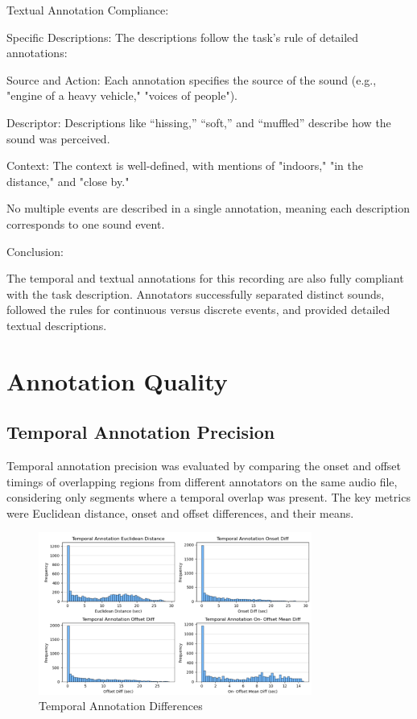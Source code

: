 \documentclass{article}
\begin{document}
Textual Annotation Compliance:

Specific Descriptions: The descriptions follow the task’s rule of detailed annotations:

Source and Action: Each annotation specifies the source of the sound (e.g., "engine of a heavy vehicle," "voices of people").

Descriptor: Descriptions like “hissing,” “soft,” and “muffled” describe how the sound was perceived.

Context: The context is well-defined, with mentions of "indoors," "in the distance," and "close by."

No multiple events are described in a single annotation, meaning each description corresponds to one sound event.

Conclusion:

The temporal and textual annotations for this recording are also fully compliant with the task description. Annotators successfully separated distinct sounds, followed the rules for continuous versus discrete events, and provided detailed textual descriptions.

\section{Annotation Quality}
\label{sec:annotation_quality}

\subsection{Temporal Annotation Precision}

Temporal annotation precision was evaluated by comparing the onset and offset timings of overlapping regions from different annotators on the same audio file, considering only segments where a temporal overlap was present. The key metrics were Euclidean distance, onset and offset differences, and their means.

\begin{figure}[H]
  \centering
  \includegraphics[width=0.8\textwidth]{figures/annotation_quality/temporal_annotation_differences.png}
  \caption{Temporal Annotation Differences}
  \label{fig:temporal_diff}
\end{figure}
\end{document}
